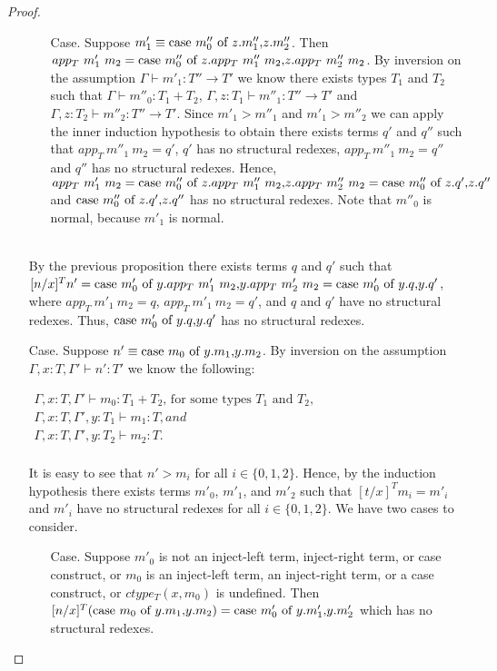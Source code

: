 \begin{proof}
\begin{itemize}
\begin{itemize}
  \item[Case.] Suppose $m'_1 \equiv \mbox{case}\ m''_0\ \text{of}\ z\text{.}m''_1\text{,}z\text{.}m''_2$.  Then\\
    $app_T\ m'_1\ m_2 = \ccon{m''_0}{z}{app_T\ m''_1\ m_2}{app_T\ m''_2\ m_2}$.  By inversion on the assumption
    $\Gamma \vdash m'_1:T''\to T'$ we know there exists types $T_1$ and $T_2$ such that
    $\Gamma \vdash m''_0:T_1+T_2$, $\Gamma,z:T_1 \vdash m''_1:T''\to T'$
    and $\Gamma,z:T_2 \vdash m''_2:T''\to T'$.  Since $m'_1 > m''_1$ and $m'_1 > m''_2$ we can 
    apply the inner induction hypothesis to obtain there exists terms $q'$ and $q''$ such that 
    $app_T\ m''_1\ m_2 = q'$, $q'$ has no structural redexes, $app_T\ m''_1\ m_2 = q''$ and $q''$ has no structural redexes.  
    Hence, 
    $app_T\ m'_1\ m_2 = \ccon{m''_0}{z}{app_T\ m''_1\ m_2}{app_T\ m''_2\ m_2} = \ccon{m''_0}{z}{q'}{q''}$ and
    $\mbox{case}\ m''_0\ \text{of}\ z\text{.}q'\text{,}z\text{.}q''$ has no structural redexes.  Note that $m''_0$ is normal, because $m'_1$ is
    normal.  
  \end{itemize}

  
  \ \\
  By the previous proposition there exists terms $q$ and $q'$ such that \\
  $[n/x]^T n' = \ccon{m'_0}{y}{app_T\ m'_1\ m_2}{app_T\ m'_2\ m_2}
  = \ccon{m'_0}{y}{q}{q'}$, where $app_T\ m'_1\ m_2 = q$, $app_T\ m'_1\ m_2 = q'$, and
  $q$ and $q'$ have no structural redexes.  Thus, $\mbox{case}\ m'_0\ \text{of}\ y\text{.}q\text{,}y\text{.}q'$ has no
  structural redexes.  
  
\item[Case.] Suppose $n' \equiv \mbox{case}\ m_0\ \text{of}\ y\text{.}m_1\text{,}y\text{.}m_2$. By inversion on the assumption
  $\Gamma,x:T,\Gamma' \vdash n':T'$ we know the following:
  \begin{center}
    \begin{math}
      \begin{array}{lll}
        \Gamma,x:T,\Gamma' \vdash m_0:T_1+T_2 \text{, for some types } T_1 \text{ and } T_2,\\
        \Gamma,x:T,\Gamma',y:T_1 \vdash m_1:T, and\\
        \Gamma,x:T,\Gamma',y:T_2 \vdash m_2:T.\\
      \end{array}
    \end{math}
  \end{center}
  It is easy to see that
  $n' > m_i$ for all $i \in \{0,1,2\}$.  Hence, by the induction hypothesis
  there exists terms $m'_0$, $m'_1$, and $m'_2$ such that $[t/x]^T m_i = m'_i$ and $m'_i$ have no structural redexes
  for all $i \in \{0,1,2\}$.  We have two cases to consider.
  \begin{itemize}
  \item[Case.] Suppose $m'_0$ is not an inject-left term, inject-right term, or case construct, or
    $m_0$ is an inject-left term, an inject-right term, or a case construct, or $ctype_T(x,m_0)$ is undefined.
    Then \\
    $[n/x]^{T} (\mbox{case}\ m_0\ \text{of}\ y\text{.}m_1\text{,}y\text{.}m_2) = \mbox{case}\ m'_0\ \text{of}\ y\text{.}m'_1\text{,}y\text{.}m'_2$ which has no structural redexes.
    

\end{itemize}
\end{itemize}
\end{proof}

